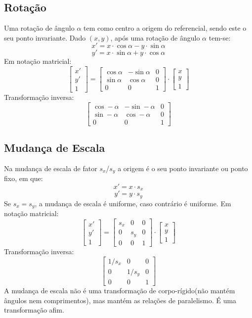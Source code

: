 \documentclass[10pt,a4paper]{report}
\begin{document}
\subsection{Rotação}
Uma rotação de ângulo $\alpha$ tem como centro a origem do referencial, sendo este o seu ponto invariante. Dado $(x,y)$, após uma rotação de ângulo $\alpha$ tem-se:
$$
x'=x\cdot \cos \alpha - y\cdot \sin \alpha
$$$$
y'=x\cdot \sin \alpha + y\cdot \cos \alpha
$$
Em notação matricial:
$$
\begin{bmatrix}
x'\\
y'\\
1
\end{bmatrix} = 
\begin{bmatrix}
\cos \alpha & -\sin \alpha & 0\\
\sin \alpha & \cos \alpha & 0\\
0 & 0 & 1
\end{bmatrix}\cdot \begin{bmatrix}
x\\
y\\
1
\end{bmatrix}
$$ 
Transformação inversa:
$$
\begin{bmatrix}
\cos -\alpha & -\sin -\alpha & 0\\
\sin -\alpha & \cos -\alpha & 0\\
0 & 0 & 1
\end{bmatrix}
$$
\subsection{Mudança de Escala}
Na mudança de escala de fator $s_x$/$s_y$ a origem é o seu ponto invariante ou ponto fixo, em que:
$$
x'=x\cdot s_x
$$
$$
y'=y\cdot s_y
$$
Se $s_x = s_y$, a mudança de escala é uniforme, caso contrário é uniforme. Em notação matricial:
$$
\begin{bmatrix}
x'\\
y'\\
1
\end{bmatrix} = 
\begin{bmatrix}
s_x & 0 & 0\\
0 & s_y & 0\\
0 & 0 & 1
\end{bmatrix}\cdot \begin{bmatrix}
x\\
y\\
1
\end{bmatrix}
$$ 
Transformação inversa:
$$
\begin{bmatrix}
1/s_x & 0 & 0\\
0 & 1/s_y & 0\\
0 & 0 & 1
\end{bmatrix}
$$
A mudança de escala não é uma transformação de corpo-rígido(não mantém ângulos nem comprimentos), mas mantém as relações de paralelismo. É uma transformação afim.
\end{document}
